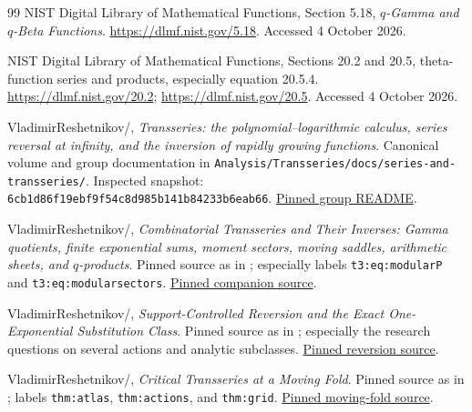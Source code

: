 \begin{thebibliography}{99}
NIST Digital Library of Mathematical Functions,
Section 5.18, \emph{\(q\)-Gamma and \(q\)-Beta Functions}.
\url{https://dlmf.nist.gov/5.18}.
Accessed 4 October 2026.

NIST Digital Library of Mathematical Functions,
Sections 20.2 and 20.5, theta-function series and products,
especially equation 20.5.4.
\url{https://dlmf.nist.gov/20.2};
\url{https://dlmf.nist.gov/20.5}.
Accessed 4 October 2026.

VladimirReshetnikov/\repo{},
\emph{Transseries: the polynomial--logarithmic calculus, series reversal
at infinity, and the inversion of rapidly growing functions}.
Canonical volume and group documentation in
\texttt{Analysis/Transseries/docs/series-and-transseries/}.
Inspected snapshot:
\texttt{6cb1d86f19ebf9f54c8d985b141b84233b6eab66}.
\href{https://github.com/VladimirReshetnikov/ProveIt/blob/6cb1d86f19ebf9f54c8d985b141b84233b6eab66/Analysis/Transseries/docs/series-and-transseries/README.md}{Pinned group README}.

VladimirReshetnikov/\repo{},
\emph{Combinatorial Transseries and Their Inverses:
Gamma quotients, finite exponential sums, moment sectors,
moving saddles, arithmetic sheets, and \(q\)-products}.
Pinned source as in \cite{repo-trans};
especially labels \texttt{t3:eq:modularP} and
\texttt{t3:eq:modularsectors}.
\href{https://github.com/VladimirReshetnikov/ProveIt/blob/6cb1d86f19ebf9f54c8d985b141b84233b6eab66/Analysis/Transseries/docs/series-and-transseries/Combinatorial_Transseries_Inverses/Combinatorial_Transseries_Inverses.tex}{Pinned companion source}.

VladimirReshetnikov/\repo{},
\emph{Support-Controlled Reversion and the Exact One-Exponential
Substitution Class}.
Pinned source as in \cite{repo-trans}; especially the research
questions on several actions and analytic subclasses.
\href{https://github.com/VladimirReshetnikov/ProveIt/blob/6cb1d86f19ebf9f54c8d985b141b84233b6eab66/Analysis/Transseries/docs/series-and-transseries/Support_Controlled_Reversion_One_Exponential/reversion_and_one_exponential.tex}{Pinned reversion source}.

VladimirReshetnikov/\repo{},
\emph{Critical Transseries at a Moving Fold}.
Pinned source as in \cite{repo-trans}; labels
\texttt{thm:atlas}, \texttt{thm:actions}, and \texttt{thm:grid}.
\href{https://github.com/VladimirReshetnikov/ProveIt/blob/6cb1d86f19ebf9f54c8d985b141b84233b6eab66/Analysis/Transseries/docs/series-and-transseries/Critical_Transseries_Moving_Fold/article.tex}{Pinned moving-fold source}.


\end{thebibliography}
